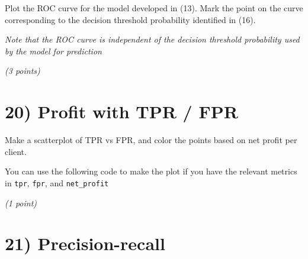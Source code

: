 \documentclass[
  letterpaper,
  DIV=11,
  numbers=noendperiod]{scrreprt}
\newenvironment{Shaded}{\begin{snugshade}}{\end{snugshade}}
\newcommand{\BuiltInTok}[1]{\textcolor[rgb]{0.00,0.23,0.31}{#1}}
\newcommand{\CharTok}[1]{\textcolor[rgb]{0.13,0.47,0.30}{#1}}
\newcommand{\DecValTok}[1]{\textcolor[rgb]{0.68,0.00,0.00}{#1}}
\newcommand{\FloatTok}[1]{\textcolor[rgb]{0.68,0.00,0.00}{#1}}
\newcommand{\ImportTok}[1]{\textcolor[rgb]{0.00,0.46,0.62}{#1}}
\newcommand{\NormalTok}[1]{\textcolor[rgb]{0.00,0.23,0.31}{#1}}
\newcommand{\OperatorTok}[1]{\textcolor[rgb]{0.37,0.37,0.37}{#1}}
\newcommand{\StringTok}[1]{\textcolor[rgb]{0.13,0.47,0.30}{#1}}
\newcommand{\VariableTok}[1]{\textcolor[rgb]{0.07,0.07,0.07}{#1}}
\begin{document}
Plot the ROC curve for the model developed in (13). Mark the point on
the curve corresponding to the decision threshold probability identified
in (16).

\emph{Note that the ROC curve is independent of the decision threshold
probability used by the model for prediction}

\emph{(3 points)}

\section{20) Profit with TPR / FPR}\label{profit-with-tpr-fpr}

Make a scatterplot of TPR vs FPR, and color the points based on net
profit per client.

You can use the following code to make the plot if you have the relevant
metrics in \texttt{tpr}, \texttt{fpr}, and \texttt{net\_profit}

\emph{(1 point)}

\begin{Shaded}
\end{Shaded}

\section{21) Precision-recall}\label{precision-recall-1}
\end{document}
